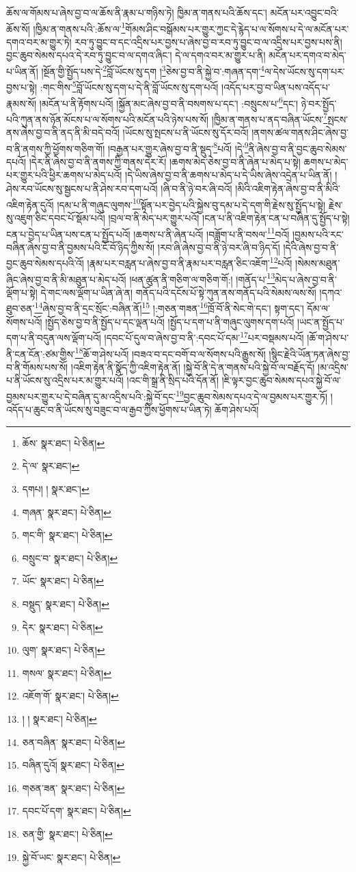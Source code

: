 ཆོས་ལ་གོམས་པ་ཞེས་བྱ་བ་ལ་ཆོས་ནི་རྣམ་པ་གཉིས་ཏེ། ཁྱིམ་ན་གནས་པའི་ཆོས་དང་། མངོན་པར་འབྱུང་བའི་ཆོས་སོ། །ཁྱིམ་ན་གནས་པའི་:ཆོས་ལ་\footnote{ཆོས་  སྣར་ཐང་།  པེ་ཅིན། }གོམས་ཤིང་བསྒོམས་པར་གྱུར་ཀྱང་དེ་རྙེད་པ་ལ་སོགས་པ་དེ་ལ་མངོན་པར་དགའ་བར་མ་གྱུར་ཏེ། རབ་ཏུ་བྱུང་བ་དང་འདྲིས་པར་བྱས་པ་ཞེས་བྱ་བ་རབ་ཏུ་བྱུང་བ་ལ་འདྲིས་པར་བྱས་པས་ནི། བྱང་ཆུབ་སེམས་དཔའ་དེ་རབ་ཏུ་བྱུང་བ་ལ་དགའ་ཞིང་། དེ་ལ་དགའ་བར་མ་གྱུར་པ་ནི། མངོན་པར་དགའ་བ་མེད་པ་ཡིན་ནོ། །སྔོན་གྱི་སྤྱོད་པས་དེ་\footnote{དེ་ལ་  སྣར་ཐང་། }བློ་ཡོངས་སུ་དག །\footnote{དགཔ། །  སྣར་ཐང་། }ཅེས་བྱ་བ་ནི་སྐྱེ་བ་:གཞན་དག་\footnote{གཞན་  སྣར་ཐང་།  པེ་ཅིན། }ལ་དེས་ཡོངས་སུ་དག་པར་བྱས་པ་སྟེ། :གང་གིས་\footnote{གང་གི་  སྣར་ཐང་།  པེ་ཅིན། }བློ་ཡོངས་སུ་དག་པ་དེ་ནི་བློ་ཡོངས་སུ་དག་པའོ། །འདོད་པར་བྱ་བ་ཡིན་པས་འདོད་པ་རྣམས་སོ། །མངོན་པ་ནི་རྟོགས་པའོ། །སྐྱོན་མང་ཞེས་བྱ་བ་ནི་བསགས་པ་དང་། :བསྲུངས་པ་\footnote{བསྲུང་བ་  སྣར་ཐང་།  པེ་ཅིན། }དང་། ཉེ་བར་སྤྱོད་པའི་ཀུན་ནས་ཉོན་མོངས་པ་ལ་སོགས་པའི་མངོན་པའི་ཉེས་པས་སོ། །ཁྱིམ་ན་གནས་པ་ནད་བཞིན་ཡོངས་\footnote{ཡོང་  སྣར་ཐང་།  པེ་ཅིན། }སྤངས་ནས་ཞེས་བྱ་བ་ནི་ནད་ནི་མི་བདེ་བའོ། །ཡོངས་སུ་སྤངས་པ་ནི་ཡོངས་སུ་དོར་བའོ། །ནགས་ཚལ་གནས་ཤིང་ཞེས་བྱ་བ་ནི་ནགས་ཀྱི་ཕྱོགས་གཅིག་གོ། །བརྒྱན་པར་གྱུར་ཞེས་བྱ་བ་ནི་སྡུད་\footnote{བསྡུད་  སྣར་ཐང་།  པེ་ཅིན། }པའོ། །དེ་\footnote{དེར་  སྣར་ཐང་།  པེ་ཅིན། }ནི་ཞེས་བྱ་བ་ནི་བྱང་ཆུབ་སེམས་དཔའོ། །དེར་ནི་ཞེས་བྱ་བ་ནི་ནགས་ཀྱི་གནས་དེར་རོ། །ཆགས་མེད་ཅེས་བྱ་བ་ནི་ཞེན་པ་མེད་པ་སྟེ། ཆགས་པ་མེད་པར་གྱུར་པའི་ཕྱིར་ཆགས་པ་མེད་པའོ། །དེ་ཡིས་ཞེས་བྱ་བ་ནི་ཆགས་པ་མེད་པ་དེ་ཡིས་ཞེས་འདྲེན་པ་ཡིན་ནོ། །ཤེས་རབ་ཡོངས་སུ་སྦྱངས་པ་ནི་ཤེས་རབ་དག་པའོ། །ཞི་བ་ནི་ཉེ་བར་ཞི་བའོ། །མིའི་འཇིག་རྟེན་ཞེས་བྱ་བ་ནི་མིའི་འཇིག་རྟེན་དུའོ། །དམ་པ་ནི་གཞུང་ལུགས་\footnote{ལུག་  སྣར་ཐང་།  པེ་ཅིན། }སྟོན་པར་བྱེད་པའི་སྐྱེས་བུ་དམ་པ་དེ་དག་གི་རྗེས་སུ་སྤྱོད་པ་སྟེ། རྗེས་སུ་འཇུག་ཅིང་དབང་པོ་སྡོམ་པའོ། །བྲལ་བ་ནི་མེད་པར་གྱུར་པའོ། །ངན་པ་ནི་འཇིག་རྟེན་ངན་པ་བཞིན་དུ་སྤྱོད་པ་སྟེ། ངན་པ་བྱེད་པ་ཡིན་པས་ངན་པ་སྤྱོད་པའོ། །ཆགས་པ་ནི་ཞེན་པའོ། །བཟློག་པ་ནི་བསལ་\footnote{གསལ་  སྣར་ཐང་།  པེ་ཅིན། }བའོ། །བྱམས་པའི་རང་བཞིན་ཞེས་བྱ་བ་ནི་བྱམས་པའི་ངོ་བོ་ཉིད་ཀྱིས་སོ། །རབ་ཞི་ཞེས་བྱ་བ་ནི་ཉེ་བར་ཞི་བ་ཉིད་དོ། །དེའི་ཞེས་བྱ་བ་ནི་བྱང་ཆུབ་སེམས་དཔའི་འོ། །རྣམ་པར་བརླན་པ་ཞེས་བྱ་བ་ནི་རྣམ་པར་བརླན་ཅིང་འཇོག་\footnote{འཇོག་གོ་  སྣར་ཐང་།  པེ་ཅིན། }པའོ། །སེམས་མཐུན་ཞིང་ཞེས་བྱ་བ་ནི་མི་མཐུན་པ་མེད་པའོ། །ཕན་ཚུན་ནི་གཅིག་ལ་གཅིག་གོ:། །གནོད་པ་\footnote{། །  སྣར་ཐང་།  པེ་ཅིན། }མེད་པ་ཞེས་བྱ་བ་ནི་ལྡོག་པ་སྟེ། དེ་གང་ལས་ལྡོག་པ་ཡིན་ཞེ་ན། གནོད་པའི་དངོས་པོ་སྟེ་ཀུན་ནས་གནོད་པའི་སེམས་ལས་སོ། །དཀའ་ཐུབ་ཅན་\footnote{ཅན་བཞིན་  སྣར་ཐང་།  པེ་ཅིན། }ཞེས་བྱ་བ་ནི་དྲང་སྲོང་:བཞིན་ནོ།\footnote{བཞིན་དུའོ།  སྣར་ཐང་།  པེ་ཅིན། } །:གཅན་གཟན་\footnote{གཅན་ཟན་  སྣར་ཐང་།  པེ་ཅིན། }ཁྲོ་བོ་ནི་སེང་གེ་དང་། སྟག་དང་། དོམ་ལ་སོགས་པའོ། །སྤྱོད་ཅེས་བྱ་བ་ནི་སྤྱོད་པ་དང་ལྡན་པའོ། །སྤྱོད་པ་དག་པ་ནི་གཞུང་ལུགས་དག་པའོ། །ཡང་ན་སྤྱོད་པ་དག་པ་ནི་བདུན་ལས་ལྡོག་པའོ། །དབང་པོ་དུལ་བ་ཞེས་བྱ་བ་ནི་:དབང་པོ་དམ་\footnote{དབང་པོ་དག་  སྣར་ཐང་།  པེ་ཅིན། }པར་བསྡམས་པའོ། །ཆོ་ག་ཤེས་པ་ནི་ངན་ངོན་:ཙམ་གྱིས་\footnote{ཅན་གྱི་  སྣར་ཐང་།  པེ་ཅིན། }ཆོ་ག་ཤེས་པའོ། །བཟའ་བ་དང་བགོ་བ་ལ་སོགས་པའི་རྒྱུས་སོ། །སྙིང་རྗེའི་ཡོན་ཏན་ཞེས་བྱ་བ་ནི་གོམས་པས་སོ། །འཇིག་རྟེན་ནི་སྣོད་ཀྱི་འཇིག་རྟེན་ནོ། །སྐྱེ་བོ་ནི་དེ་ན་གནས་པའི་སྐྱེ་བོ་ལ་བརྗོད་དོ། །མ་འདྲིས་པ་ནི་ཡོངས་སུ་འདྲིས་པར་མ་གྱུར་པའོ། །འང་གི་སྒྲ་ནི་སྲིད་པའི་དོན་ནོ། །ཇི་ལྟར་བྱང་ཆུབ་སེམས་དཔའ་སྐྱེ་བོ་ལ་བྱམས་པར་གྱུར་པ་དེ་བཞིན་དུ་མ་འདྲིས་པའི་:སྐྱེ་བོ་དང་\footnote{སྐྱེ་བོ་ཡང་  སྣར་ཐང་།  པེ་ཅིན། }བྱང་ཆུབ་སེམས་དཔའ་དེ་ལ་བྱམས་པར་གྱུར་ཏོ། །འདོད་པ་ཆུང་བ་ནི་ཡོངས་སུ་བཟུང་བ་ལ་རྒྱབ་ཀྱིས་ཕྱོགས་པ་ཡིན་ཏེ། ཆོག་ཤེས་པའོ། 